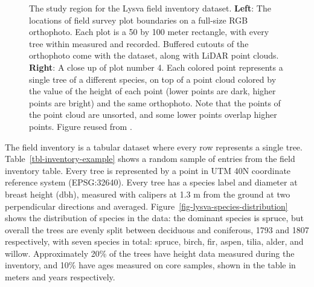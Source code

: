 \begin{figure}
\caption[The study region for the Lysva field inventory.]{\label{fig-lysva-roi}The study region for the Lysva field
inventory dataset. \textbf{Left}: The locations of field survey plot
boundaries on a full-size RGB orthophoto. Each plot is a 50 by 100 meter
rectangle, with every tree within measured and recorded. Buffered
cutouts of the orthophoto come with the dataset, along with LiDAR point
clouds. \textbf{Right}: A close up of plot number 4. Each colored point
represents a single tree of a different species, on top of a point cloud
colored by the value of the height of each point (lower points are dark,
higher points are bright) and the same orthophoto.
Note that the points of the point cloud are unsorted, and some lower points overlap higher points.
Figure reused from \citet{dubrovinOpenDatasetIndividual2024}.}
\end{figure}


The field inventory is a tabular dataset where every row represents a single tree.
Table~\ref{tbl-inventory-example} shows a random sample of entries from the field inventory table.
Every tree is represented by a point in UTM 40N coordinate reference system (EPSG:32640).
Every tree has a species label and diameter at breast height (dbh), measured with calipers at 1.3 m from the ground at two perpendicular directions and averaged.
Figure~\ref{fig-lysva-species-distribution} shows the distribution of species in the data: the dominant species is spruce, but overall the trees are evenly split between deciduous and coniferous, 1793 and 1807 respectively, with seven species in total: spruce, birch, fir, aspen, tilia, alder, and willow.
Approximately 20\% of the trees have height data measured during the inventory, and 10\% have ages measured on core samples, shown in the table in meters and years respectively.


